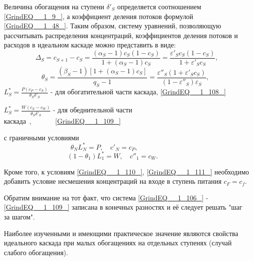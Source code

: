 Величина обогащения на ступени $\delta '_{S} $ определяется соотношением \ref{GrindEQ__1_9_}, а коэффициент деления потоков формулой \ref{GrindEQ__1_48_}. Таким образом, систему уравнений, позволяющую рассчитывать распределения концентраций, коэффициентов деления потоков и расходов в идеальном каскаде можно представить в виде:
\begin{equation} \label{GrindEQ__1_106_} 
\Delta _{S} =c_{S+1} -c_{S} =\frac{(\alpha _{S} -1)c_{S} (1-c_{S} )}{1+(\alpha _{S} -1)c_{S} } =\frac{\varepsilon '_{S} c_{S} (1-c_{S} )}{1+\varepsilon '_{S} c_{S} } , 
\end{equation} 
\begin{equation} \label{GrindEQ__1_107_} 
\theta _{S} =\frac{(\beta _{S} -1)\left[1+(\alpha _{S} -1)c_{S} \right]}{q_{S} -1} =\frac{\varepsilon ''_{S} (1+\varepsilon '_{S} c_{S} )}{(1-\varepsilon ''_{S} )\varepsilon _{S} } ,~              ~ 
\end{equation} 
$L_{S}^{*} =\frac{P(c_{P} -c_{S} )}{\theta _{S} \delta '_{S} } $ - для обогатительной части каскада,        \ref{GrindEQ__1_108_}

\noindent $L_{S}^{*} =\frac{W(c_{S} -c_{W} )}{\theta _{S} \delta '_{S} } $ - для обеднительной части каскада~,~~~~~~~\ref{GrindEQ__1_109_}

с граничными условиями
\begin{equation} \label{GrindEQ__1_110_} 
\theta _{N} L_{N}^{*} =P,\quad c'_{N} =c_{P} ,~~~~~~~~~~~~~~~~~~~~~~~~~~~~~~ 
\end{equation} 
\begin{equation} \label{GrindEQ__1_111_} 
(1-\theta _{1} )L_{1}^{*} =W,\quad c''_{1} =c_{W} .~~~~~~~~~~~~~~~~~~~ 
\end{equation} 

Кроме того, к условиям \ref{GrindEQ__1_110_}, \ref{GrindEQ__1_111_} необходимо добавить условие несмешения концентраций на входе в ступень питания $c_{F} =c_{f} $.

Обратим внимание на тот факт, что система \ref{GrindEQ__1_106_} - \ref{GrindEQ__1_109_} записана в конечных разностях и её следует решать "шаг за шагом".

Наиболее изученными и имеющими практическое значение являются свойства идеального каскада при малых обогащениях на отдельных ступенях (случай слабого обогащения).


